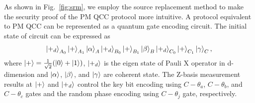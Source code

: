 \documentclass[aps,twocolumn,superscriptaddress,showpacs,nofootinbib]{revtex4-2}
\begin{document}
As shown in Fig.~\ref{fig:srm},  we employ the source replacement method \cite{AQTHuang2024} to make the security proof of the PM QCC protocol more intuitive. A protocol equivalent to PM QCC can be represented as a quantum gate encoding circuit. The initial state of circuit can be expressed as
\begin{equation}
\ket{+_d}_{A_0}\ket{+}_{A_1}\ket{\alpha}_{A}\ket{+_d}_{B_0}\ket{+}_{B_1}\ket{\beta}_{B}\ket{+_d}_{C_0}\ket{+}_{C_1}\ket{\gamma}_{C},
\end{equation}
where $\ket{+} = \frac{1}{\sqrt{2}}(\ket{0}+\ket{1})$, $\ket{+_d}$ is the eigen state of Pauli X operator in d-dimension and $\ket{\alpha}$, $\ket{\beta}$,  and $\ket{\gamma}$ are coherent state. The Z-basis measurement results at $\ket{+}$ and $\ket{+_d}$ control the key bit encoding using $C-\theta_a$, $C-\theta_b$, and $C-\theta_c$ gates and the random phase encoding using $C-\theta_j$ gate, respectively.
\end{document}
